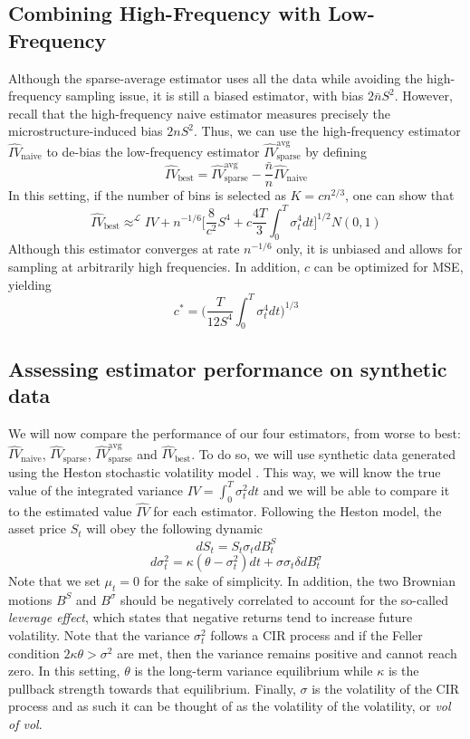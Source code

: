 \documentclass[a4paper,12pt,twoside]{article}
\begin{document}
\subsection{Combining High-Frequency with Low-Frequency}
Although the sparse-average estimator uses all the data while avoiding the high-frequency sampling issue, it is still a biased estimator, with bias $2\bar{n}S^2$. However, recall that the high-frequency naive estimator measures precisely the microstructure-induced bias $2nS^2$. Thus, we can use the high-frequency estimator $\hat{IV}_\text{naive}$ to de-bias the low-frequency estimator $\hat{IV}_\text{sparse}^\text{avg}$ by defining $$\hat{IV}_\text{best}=\hat{IV}_\text{sparse}^\text{avg}-\frac{\bar{n}}{n}\hat{IV}_\text{naive}$$
In this setting, if the number of bins is selected as $K=cn^{2/3}$, one can show that
$$\hat{IV}_\text{best} \approx^{\mathcal{L}} IV + n^{-1/6}\big[ \frac{8}{c^2}S^4 + c\frac{4T}{3}\int_0^T \sigma_t^4 dt \big]^{1/2}N(0,1)$$
Although this estimator converges at rate $n^{-1/6}$ only, it is unbiased and allows for sampling at arbitrarily high frequencies. In addition, $c$ can be optimized for MSE, yielding $$c^*=\big( \frac{T}{12S^4}\int_0^T \sigma_t^4 dt \big)^{1/3}$$

\subsection{Assessing estimator performance on synthetic data}
We will now compare the performance of our four estimators, from worse to best: $\hat{IV}_\text{naive}$, $\hat{IV}_\text{sparse}$, $\hat{IV}_\text{sparse}^\text{avg}$ and $\hat{IV}_\text{best}$.
To do so, we will use synthetic data generated using the Heston stochastic volatility model \cite{heston}. This way, we will know the true value of the integrated variance $IV=\int_0^T \sigma_t^2 dt$ and we will be able to compare it to the estimated value $\hat{IV}$ for each estimator.
Following the Heston model, the asset price $S_t$ will obey the following dynamic
$$dS_t = S_t\sigma_t dB_t^S$$
$$d\sigma_t^2 = \kappa(\theta-\sigma_t^2)dt + \sigma \sigma_t\delta dB_t^\sigma$$
Note that we set $\mu_t=0$ for the sake of simplicity. In addition, the two Brownian motions $B^S$ and $B^\sigma$ should be negatively correlated to account for the so-called \textit{leverage effect}, which states that negative returns tend to increase future volatility. Note that the variance $\sigma_t^2$ follows a CIR process and if the Feller condition $2\kappa \theta > \sigma^2$ are met, then the variance remains positive and cannot reach zero. In this setting, $\theta$ is the long-term variance equilibrium while $\kappa$ is the pullback strength towards that equilibrium. Finally, $\sigma$ is the volatility of the CIR process and as such it can be thought of as the volatility of the volatility, or \textit{vol of vol}.
\end{document}
